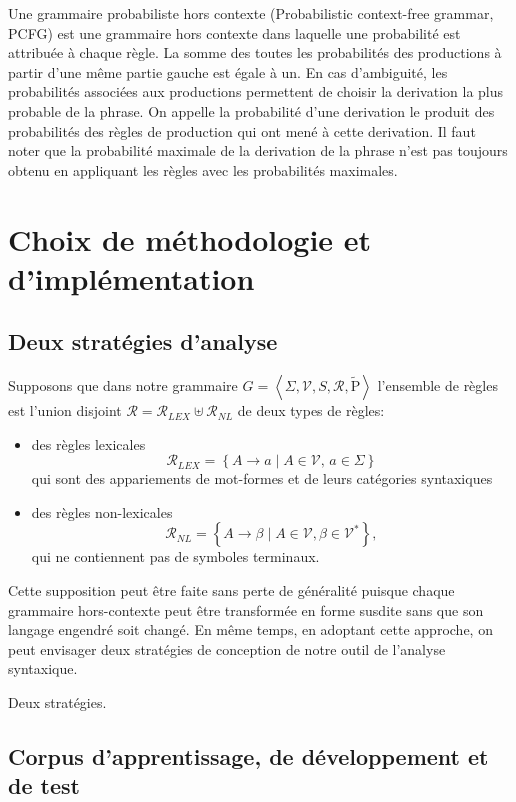 \documentclass[12pt]{article}
\begin{document}
Une grammaire probabiliste hors contexte (Probabilistic context-free grammar,
PCFG) est une grammaire hors contexte dans laquelle une probabilit\'e est
attribu\'ee \`a chaque r\`egle. La somme des toutes les probabilit\'es des
productions \`a partir d'une m\^eme partie gauche est \'egale \`a un. 
En cas d'ambiguit\'e, les probabilit\'es associ\'ees aux productions permettent
de choisir la derivation la plus probable de la phrase. On appelle la
probabilit\'e d'une derivation le produit des probabilit\'es des r\`egles de
production qui ont men\'e \`a cette derivation. Il faut noter que la
probabilit\'e maximale de la derivation de la phrase n'est pas toujours obtenu
en appliquant les r\`egles avec les probabilit\'es maximales.


\section{Choix de m\'ethodologie et d'impl\'ementation}

\subsection{Deux strat\'egies d'analyse}

Supposons que dans notre grammaire $G = \left< \Sigma, \mathscr{V}, S, \mathscr{R}, \tilde{\mathrm{P}} \right>$ l'ensemble de r\`egles est l'union disjoint $\mathscr{R} = \mathscr{R}_{LEX} \uplus \mathscr{R}_{NL}$ de deux types de r\`egles:
\begin{itemize}
\item des r\`egles lexicales
$$\mathscr{R}_{LEX} = \left\{ A \rightarrow a \mid
        A \in \mathscr{V}, \, a \in \Sigma \right\}$$
qui sont des appariements de mot-formes et de leurs cat\'egories syntaxiques
\item des r\`egles non-lexicales
$$\mathscr{R}_{NL} = \left\{ A \rightarrow \beta \mid
     A \in \mathscr{V}, \beta \in \mathscr{V}^* \right\},$$
qui ne contiennent pas de symboles terminaux.
\end{itemize}

Cette supposition peut \^etre faite sans perte de g\'en\'eralit\'e puisque
chaque grammaire hors-contexte peut \^etre transform\'ee en forme susdite sans
que son langage engendr\'e soit chang\'e. En m\^eme temps, en adoptant cette
approche, on peut envisager deux strat\'egies de conception de notre outil de
l'analyse syntaxique.

Deux strat\'egies.

\subsection{Corpus d'apprentissage, de d\'eveloppement et de test}
\end{document}
